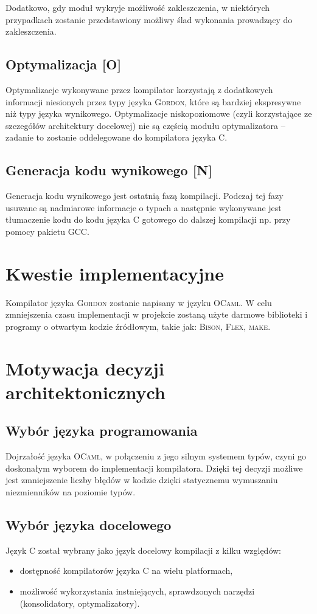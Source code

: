 \documentclass{documentation}
\begin{document}
Dodatkowo, gdy moduł wykryje możliwość zakleszczenia, w niektórych przypadkach zostanie przedstawiony możliwy ślad wykonania prowadzący do zakleszczenia. 

\subsection{Optymalizacja [O]}
\noindent Optymalizacje wykonywane przez kompilator korzystają z dodatkowych informacji
niesionych przez typy języka \textsc{Gordon}, które są bardziej ekspresywne niż typy języka
wynikowego.
Optymalizacje niskopoziomowe (czyli korzystające ze szczegółów architektury docelowej) nie
są częścią modułu optymalizatora -- zadanie to zostanie oddelegowane do kompilatora języka \textsc{C}.

\subsection{Generacja kodu wynikowego [N]}
\noindent Generacja kodu wynikowego jest ostatnią fazą kompilacji. Podczaj tej fazy usuwane są
nadmiarowe informacje o typach a następnie wykonywane jest tłumaczenie kodu do kodu języka
\textsc{C} gotowego do dalszej kompilacji np. przy pomocy pakietu \textsc{GCC}.

\section{Kwestie implementacyjne}
\noindent Kompilator języka \textsc{Gordon} zostanie napisany w języku \textsc{OCaml}. W celu
zmniejszenia czasu implementacji w projekcie zostaną użyte darmowe biblioteki i programy o otwartym
kodzie źródłowym, takie jak: \textsc{Bison}, \textsc{Flex}, \textsc{make}.

\section{Motywacja decyzji architektonicznych}
\subsection{Wybór języka programowania}
\noindent Dojrzałość języka \textsc{OCaml}, w połączeniu z jego silnym systemem typów,
czyni go doskonałym wyborem do implementacji kompilatora. Dzięki tej
decyzji możliwe jest zmniejszenie liczby błędów w kodzie dzięki statycznemu
wymuszaniu niezmienników na poziomie typów.

\subsection{Wybór języka docelowego}
\noindent Język \textsc{C} został wybrany jako język docelowy kompilacji z kilku względów:
\begin{itemize}
    \item dostępność kompilatorów języka \textsc{C} na wielu platformach,
    \item możliwość wykorzystania instniejących, sprawdzonych narzędzi (konsolidatory,
        optymalizatory).
\end{itemize}
\end{document}
